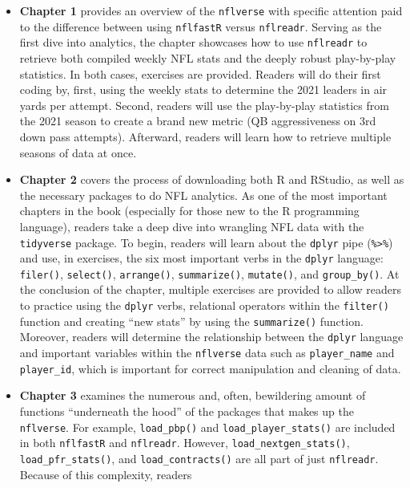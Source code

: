 \documentclass[
  letterpaper,
]{krantz}
\begin{document}
\begin{itemize}
\item
  \textbf{Chapter 1} provides an overview of the \texttt{nflverse} with
  specific attention paid to the difference between using
  \texttt{nflfastR} versus \texttt{nflreadr}. Serving as the first dive
  into analytics, the chapter showcases how to use \texttt{nflreadr} to
  retrieve both compiled weekly NFL stats and the deeply robust
  play-by-play statistics. In both cases, exercises are provided.
  Readers will do their first coding by, first, using the weekly stats
  to determine the 2021 leaders in air yards per attempt. Second,
  readers will use the play-by-play statistics from the 2021 season to
  create a brand new metric (QB aggressiveness on 3rd down pass
  attempts). Afterward, readers will learn how to retrieve multiple
  seasons of data at once.
\item
  \textbf{Chapter 2} covers the process of downloading both R and
  RStudio, as well as the necessary packages to do NFL analytics. As one
  of the most important chapters in the book (especially for those new
  to the R programming language), readers take a deep dive into
  wrangling NFL data with the \texttt{tidyverse} package. To begin,
  readers will learn about the \texttt{dplyr} pipe
  (\texttt{\%\textgreater{}\%}) and use, in exercises, the six most
  important verbs in the \texttt{dplyr} language: \texttt{filer()},
  \texttt{select()}, \texttt{arrange()}, \texttt{summarize()},
  \texttt{mutate()}, and \texttt{group\_by()}. At the conclusion of the
  chapter, multiple exercises are provided to allow readers to practice
  using the \texttt{dplyr} verbs, relational operators within the
  \texttt{filter()} function and creating ``new stats'' by using the
  \texttt{summarize()} function. Moreover, readers will determine the
  relationship between the \texttt{dplyr} language and important
  variables within the \texttt{nflverse} data such as
  \texttt{player\_name} and \texttt{player\_id}, which is important for
  correct manipulation and cleaning of data.
\item
  \textbf{Chapter 3} examines the numerous and, often, bewildering
  amount of functions ``underneath the hood'' of the packages that makes
  up the \texttt{nflverse}. For example, \texttt{load\_pbp()} and
  \texttt{load\_player\_stats()} are included in both \texttt{nflfastR}
  and \texttt{nflreadr}. However, \texttt{load\_nextgen\_stats()},
  \texttt{load\_pfr\_stats()}, and \texttt{load\_contracts()} are all
  part of just \texttt{nflreadr}. Because of this complexity, readers

\end{itemize}
\end{document}
